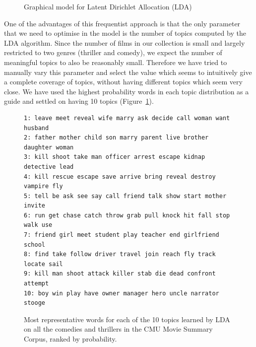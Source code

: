 \documentclass[bsc,frontabs,deptreport,singlespacing,parskip, twoside]{infthesis}
\begin{document}
\begin{figure}[h!]
\centering
{}
\caption{Graphical model for Latent Dirichlet Allocation (LDA)}
\label{fig:lda}
\end{figure}

One of the advantages of this frequentist approach is that the only parameter that we need to optimise in the model is the number of topics computed by the LDA algorithm. Since the number of films in our collection is small and largely restricted to two genres (thriller and comedy), we expect the number of meaningful topics to also be reasonably small. Therefore we have tried to manually vary this parameter and select the value which seems to intuitively give a complete coverage of topics, without having different topics which seem very close. We have used the highest probability words in each topic distribution as a guide and settled on having 10 topics (Figure~\ref{fig:lda}).

\begin{figure}[h]
\begin{minipage}{14.6cm}
\begin{Verbatim}[frame=single]
1: leave meet reveal wife marry ask decide call woman want husband
2: father mother child son marry parent live brother daughter woman
3: kill shoot take man officer arrest escape kidnap detective lead
4: kill rescue escape save arrive bring reveal destroy vampire fly
5: tell be ask see say call friend talk show start mother invite
6: run get chase catch throw grab pull knock hit fall stop walk use
7: friend girl meet student play teacher end girlfriend school 
8: find take follow driver travel join reach fly track locate sail
9: kill man shoot attack killer stab die dead confront attempt
10: boy win play have owner manager hero uncle narrator stooge
\end{Verbatim}
\end{minipage}
\caption{Most representative words for each of the 10 topics learned by LDA on all the comedies and thrillers in the CMU Movie Summary Corpus, ranked by probability.}
\label{topics}
\end{figure}
\end{document}
